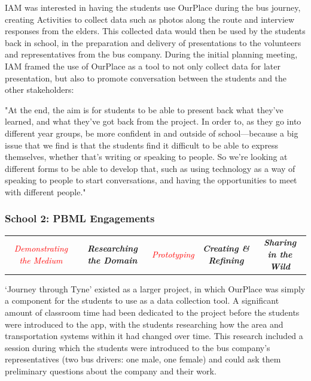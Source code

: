 IAM was interested in having the students use OurPlace during the bus journey, creating Activities to collect data such as photos along the route and interview responses from the elders. This collected data would then be used by the students back in school, in the preparation and delivery of presentations to the volunteers and representatives from the bus company. During the initial planning meeting, IAM framed the use of OurPlace as a tool to not only collect data for later presentation, but also to promote conversation between the students and the other stakeholders:

\begin{displayquote}
"At the end, the aim is for students to be able to present back what they've learned, and what they've got back from the project. In order to, as they go into different year groups, be more confident in and outside of school---because a big issue that we find is that the students find it difficult to be able to express themselves, whether that's writing or speaking to people. So we're looking at different forms to be able to develop that, such as using technology as a way of speaking to people to start conversations, and having the opportunities to meet with different people."
\end{displayquote}

\subsubsection{School 2: PBML Engagements}

\begin{table}[h]
    \centering
    \begin{tabulary}{\textwidth}{C|C|p{19mm}|C|C}
    \small\textit{\textcolor{red}{Demonstrating the Medium}} 
    & \small\textit{\textbf{Researching the Domain}}
    & \small\textit{\textcolor{red}{Prototyping}}
    & \small\textit{\textbf{Creating \& Refining}}
    & \small\textit{\textbf{Sharing in the Wild}}\\
\end{tabulary}
\end{table}

`Journey through Tyne' existed as a larger project, in which OurPlace was simply a component for the students to use as a data collection tool. A significant amount of classroom time had been dedicated to the project before the students were introduced to the app, with the students researching how the area and transportation systems within it had changed over time. This research included a session during which the students were introduced to the bus company's representatives (two bus drivers: one male, one female) and could ask them preliminary questions about the company and their work. 

